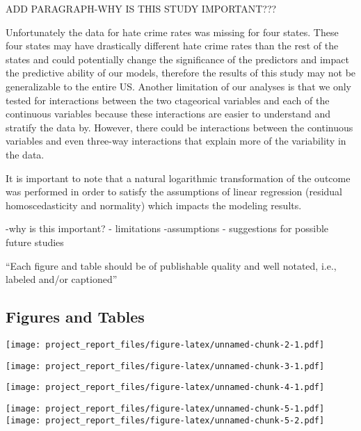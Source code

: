 \documentclass[
]{article}
\begin{document}
ADD PARAGRAPH-WHY IS THIS STUDY IMPORTANT???

Unfortunately the data for hate crime rates was missing for four states.
These four states may have drastically different hate crime rates than
the rest of the states and could potentially change the significance of
the predictors and impact the predictive ability of our models,
therefore the results of this study may not be generalizable to the
entire US. Another limitation of our analyses is that we only tested for
interactions between the two ctageorical variables and each of the
continuous variables because these interactions are easier to understand
and stratify the data by. However, there could be interactions between
the continuous variables and even three-way interactions that explain
more of the variability in the data.

It is important to note that a natural logarithmic transformation of the
outcome was performed in order to satisfy the assumptions of linear
regression (residual homoscedasticity and normality) which impacts the
modeling results.

-why is this important? - limitations -assumptions - suggestions for
possible future studies

``Each figure and table should be of publishable quality and well
notated, i.e., labeled and/or captioned''

\hypertarget{figures-and-tables}{%
\subsection{Figures and Tables}\label{figures-and-tables}}

\texttt{[image: project\_report\_files/figure-latex/unnamed-chunk-2-1.pdf]}

\texttt{[image: project\_report\_files/figure-latex/unnamed-chunk-3-1.pdf]}

\texttt{[image: project\_report\_files/figure-latex/unnamed-chunk-4-1.pdf]}

\texttt{[image: project\_report\_files/figure-latex/unnamed-chunk-5-1.pdf]}
\texttt{[image: project\_report\_files/figure-latex/unnamed-chunk-5-2.pdf]}
\end{document}
